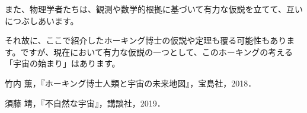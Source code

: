 \documentclass[10pt,b5paper,papersize,dvipdfmx]{jsbook}
\begin{document}
また、物理学者たちは、観測や数学的根拠に基づいて有力な仮説を立てて、互いにつぶしあいます。\par
それ故に、ここで紹介したホーキング博士の仮説や定理も覆る可能性もあります。ですが、現在において有力な仮説の一つとして、このホーキングの考える「宇宙の始まり」はあります。\par






\newpage

\begin{thebibliography}{99}
  \item 竹内 薫，『ホーキング博士人類と宇宙の未来地図』，宝島社，2018．
  \item 須藤 靖，『不自然な宇宙』，講談社，2019．
\end{thebibliography}
\end{document}
